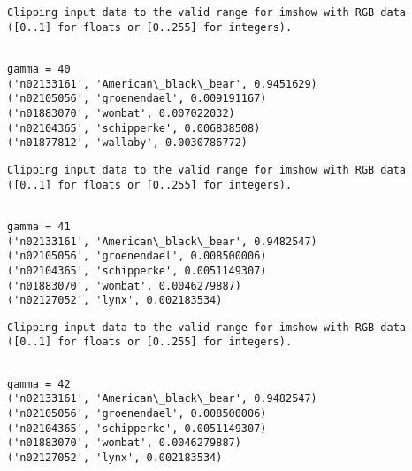 \documentclass[11pt]{article}
\begin{document}
    \begin{Verbatim}[commandchars=\\\{\}]
Clipping input data to the valid range for imshow with RGB data ([0..1] for floats or [0..255] for integers).

    \end{Verbatim}

    \begin{Verbatim}[commandchars=\\\{\}]

gamma = 40
('n02133161', 'American\_black\_bear', 0.9451629)
('n02105056', 'groenendael', 0.009191167)
('n01883070', 'wombat', 0.007022032)
('n02104365', 'schipperke', 0.006838508)
('n01877812', 'wallaby', 0.0030786772)

    \end{Verbatim}

    \begin{Verbatim}[commandchars=\\\{\}]
Clipping input data to the valid range for imshow with RGB data ([0..1] for floats or [0..255] for integers).

    \end{Verbatim}

    \begin{Verbatim}[commandchars=\\\{\}]

gamma = 41
('n02133161', 'American\_black\_bear', 0.9482547)
('n02105056', 'groenendael', 0.008500006)
('n02104365', 'schipperke', 0.0051149307)
('n01883070', 'wombat', 0.0046279887)
('n02127052', 'lynx', 0.002183534)

    \end{Verbatim}

    \begin{Verbatim}[commandchars=\\\{\}]
Clipping input data to the valid range for imshow with RGB data ([0..1] for floats or [0..255] for integers).

    \end{Verbatim}

    \begin{Verbatim}[commandchars=\\\{\}]

gamma = 42
('n02133161', 'American\_black\_bear', 0.9482547)
('n02105056', 'groenendael', 0.008500006)
('n02104365', 'schipperke', 0.0051149307)
('n01883070', 'wombat', 0.0046279887)
('n02127052', 'lynx', 0.002183534)

    \end{Verbatim}
\end{document}
